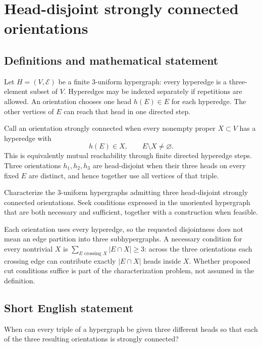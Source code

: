 \documentclass[11pt,a4paper]{article}
\begin{document}
\section*{Head-disjoint strongly connected orientations}\label{statement}

\subsection{Definitions and mathematical statement}
Let $H=(V,\mathcal E)$ be a finite $3$-uniform hypergraph: every
hyperedge is a three-element subset of $V$. Hyperedges may be indexed
separately if repetitions are allowed. An orientation chooses one
head $h(E)\in E$ for each hyperedge. The other vertices of $E$ can
reach that head in one directed step.

Call an orientation strongly connected when every nonempty proper
$X\subset V$ has a hyperedge with
\[
                         h(E)\in X,\qquad E\setminus X\ne\varnothing.
\]
This is equivalently mutual reachability through finite directed
hyperedge steps. Three orientations $h_1,h_2,h_3$ are head-disjoint
when their three heads on every fixed $E$ are distinct, and hence
together use all vertices of that triple.

Characterize the $3$-uniform hypergraphs admitting three head-disjoint
strongly connected orientations. Seek conditions expressed in the
unoriented hypergraph that are both necessary and sufficient, together
with a construction when feasible.

Each orientation uses every hyperedge, so the requested disjointness
does not mean an edge partition into three subhypergraphs. A necessary
condition for every nontrivial $X$ is
$\sum_{E\text{ crossing }X}|E\cap X|\ge3$: across the three orientations
each crossing edge can contribute exactly $|E\cap X|$ heads inside $X$.
Whether proposed cut conditions suffice is part of the characterization
problem, not assumed in the definition.
\subsection{Short English statement}
When can every triple of a hypergraph be given three different
heads so that each of the three resulting orientations is strongly connected?
\end{document}
